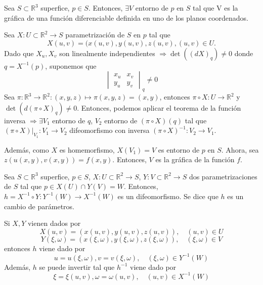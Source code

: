 \begin{prop}
  Sea $S \subset \mathbb{R}^{3}$ superfice, $p \in S$. Entonces, $\exists V$ entorno de $p$ en $S$ tal que V es la gráfica de una función diferenciable definida en uno de los planos coordenados.
\end{prop}

\begin{dem}
  Sea $X : U \subset \mathbb{R}^{2} \to S$ parametrización de $S$ en $p$ tal que
  \[
    X(u, v) = (x(u, v), y(u, v), z(u, v), (u, v) \in U.
  \]
  Dado que $X_{u}, X_{v}$ son linealmente independientes $ \Rightarrow \det((d X)_{q}) \neq 0$ donde $ q = X^{-1}(p)$, suponemos que
  \[ 
    \begin{vmatrix}
     x_{u} & x_{v} \\
     y_{u} & y_{v}
    \end{vmatrix}
    _{q}
    \neq 0
  \]
  Sea $\pi : \mathbb{R}^{3} \to \mathbb{R}^{2} : (x,y,z) \mapsto \pi(x,y,z) = (x,y)$, entonces $\pi \circ X : U \to \mathbb{R}^{2}$ y $\det(d (\pi \circ X)_{q}) \neq 0$. Entonces, podemos aplicar el teorema de la función inversa $\Rightarrow \exists V_{1}$ entorno de $q$, $V_{2}$ entorno de $(\pi \circ X)(q)$ tal que $(\pi \circ X)|_{V_{1}} : V_{1} \to V_{2}$ difeomorfismo con inversa $(\pi \circ X)^{-1} : V_{2} \to V_{1}$.

  Además, como $X$ es homemorfismo, $X(V_{1}) = V$ es entorno de $p$ en $S$. Ahora, sea $z(u(x,y),v(x,y)) = f(x,y)$. Entonces, $V$ es la gráfica de la función $f$.
\end{dem}

\begin{prop}
  Sea $S \subset \mathbb{R}^{3}$ superfice, $p \in S$, $X: U \subset \mathbb{R}^{2} \to S$, $Y: V \subset \mathbb{R}^{2} \to S$ dos parametrizaciones de $S$ tal que $p \in X(U) \cap Y(V) = W$. Entonces, $h = X^{-1} \circ Y: Y^{-1}(W) \to X^{-1}(W)$ es un difeomorfismo. Se dice que $h$ es un cambio de parámetros.
\end{prop}

\begin{obs}
  Si $X, Y$ vienen dados por
  \[ 
    X(u, v) = (x(u, v), y(u, v), z(u, v)), \quad (u,v)\in U
  \] 
    \[ 
    Y(\xi, \omega ) = (x(\xi, \omega ), y(\xi, \omega ), z(\xi, \omega )), \quad (\xi, \omega ) \in V
  \] 
  entonces $h$ viene dado por
  \[ 
    u = u(\xi, \omega), v=v(\xi, \omega), \quad (\xi, \omega ) \in Y^{-1}(W) 
  \] 
  Además, $h$ se puede invertir tal que $h^{-1}$ viene dado por
  \[ 
    \xi = \xi(u,v), \omega = \omega(u,v), \quad (u,v) \in X^{-1}(W)
  \] 
\end{obs}

